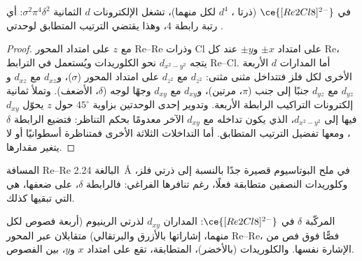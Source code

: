 \begin{proposition}\label{prop:b3:organometallic-bonding:quadruple}
في $\ce{[Re2Cl8]^{2-}}$ (ذرتا ، $d^4$ لكل منهما)، تشغل الإلكترونات $d$ الثمانية $\sigma^2\pi^4\delta^2$: أي رتبة
رابطة 4، وهذا يقتضي الترتيب المتطابق لوحدتي .
\end{proposition}

\begin{proof}
مع $z$ على امتداد المحور Re--Re وذرات Cl على امتداد $\pm x$ و$\pm y$ عند كل Re، يتجه $d_{x^2-y^2}$
نحو الكلوريدات ويُستعمل في الترابط Re--Cl. أما المدارات $d$ الأربعة الأخرى
لكل فلز فتتداخل مثنى مثنى: $d_{z^2}$ مع $d_{z^2}$ على امتداد المحور ($\sigma$)، و$d_{xz}$ مع $d_{xz}$ و$d_{yz}$
مع $d_{yz}$ جنبًا إلى جنب ($\pi$، مرتين)، و$d_{xy}$ مع $d_{xy}$ وجهًا لوجه ($\delta$، الأضعف).
وتملأ ثمانية إلكترونات التراكيب الرابطة الأربعة. وتدوير إحدى الوحدتين بزاوية $45^\circ$
حول $z$ يحوّل $d_{xy}$ فيها إلى $d_{x^2-y^2}$، الذي يكون تداخله مع $d_{xy}$ الآخر معدومًا بحكم
التناظر: فتضيع الرابطة $\delta$، ومعها تفضيل الترتيب المتطابق. أما
التداخلات الثلاثة الأخرى فمتناظرة أسطوانيًا أو لا يتغير مقدارها.
\end{proof}

المسافة Re--Re البالغة \qty{2.24}{\angstrom} في ملح البوتاسيوم قصيرة جدًا بالنسبة إلى ذرتي فلز، وكلوريدات النصفين متطابقة فعلًا، رغم
تنافرها الفراغي: فالرابطة $\delta$، على ضعفها، هي التي تبقيها كذلك.

\begin{omfigure}

{\small المركّبة $\delta$  في $\ce{[Re2Cl8]^{2-}}$: المداران $d_{xy}$
لذرتي الرينيوم (أربعة فصوص لكل منهما، إشاراتها بالأزرق والبرتقالي) متقابلان
عبر المحور Re--Re، فصًّا فوق فص من الإشارة نفسها. والكلوريدات (بالأخضر)،
المتطابقة، تقع على امتداد $x$ و$y$، بين الفصوص.}
\end{omfigure}

